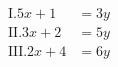 \documentclass[preview]{standalone}
\begin{document}
\begin{align*}
\text{I.} 5x + 1 &= 3y\\ \text{II.} 3x+2 &= 5y \\ \text{III.} 2x+4 &= 6y
\end{align*}
\end{document}
